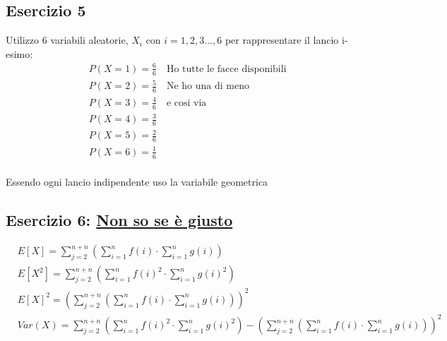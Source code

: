 \documentclass[12pt]{article}
\begin{document}
\subsection*{Esercizio 5}
Utilizzo 6 variabili aleatorie, \(X_i\) con \(i = 1,2,3\dots, 6\) per rappresentare il lancio i-esimo:
\begin{align*}
    &P(X = 1) = \frac{6}{6} \quad \text{Ho tutte le facce disponibili} \\
    &P(X = 2) = \frac{5}{6} \quad \text{Ne ho una di meno}\\
    &P(X = 3) = \frac{4}{6} \quad \text{e cosi via}\\
    &P(X = 4) = \frac{3}{6} \\
    &P(X = 5) = \frac{2}{6}\\
    &P(X = 6) = \frac{1}{6}\\
\end{align*}

Essendo ogni lancio indipendente uso la variabile geometrica 
\subsection*{Esercizio 6: \underline{Non so se è giusto}}

\begin{align}
    &E[X] = \sum_{j=2}^{n+n}(\sum_{i=1}^{n} f(i) \cdot \sum_{i=1}^{n} g(i)) \\
    &E[X^2] = \sum_{j=2}^{n+n}(\sum_{i=1}^{n} f(i)^2 \cdot \sum_{i=1}^{n} g(i)^2) \\    
    &E[X]^2 = (\sum_{j=2}^{n+n}(\sum_{i=1}^{n} f(i) \cdot \sum_{i=1}^{n} g(i)))^2 \\
    &Var(X) = \sum_{j=2}^{n+n}(\sum_{i=1}^{n} f(i)^2 \cdot \sum_{i=1}^{n} g(i)^2) - (\sum_{j=2}^{n+n}(\sum_{i=1}^{n} f(i) \cdot \sum_{i=1}^{n} g(i)))^2 
\end{align}
\end{document}
